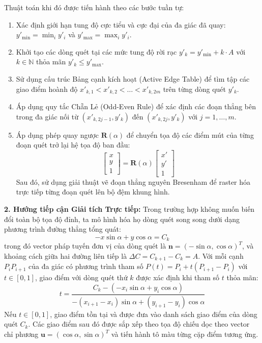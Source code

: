 Thuật toán khi đó được tiến hành theo các bước tuần tự:
\begin{enumerate}[label=\alph*)]
    \item Xác định giới hạn tung độ cực tiểu và cực đại của đa giác đã quay: $y'_{\min} = \min_{i} y'_i$ và $y'_{\max} = \max_{i} y'_i$.
    \item Khởi tạo các dòng quét tại các mức tung độ rời rạc $y'_k = y'_{\min} + k \cdot A$ với $k \in \mathbb{N}$ thỏa mãn $y'_k \le y'_{\max}$.
    \item Sử dụng cấu trúc Bảng cạnh kích hoạt (Active Edge Table) để tìm tập các giao điểm hoành độ $x'_{k, 1} < x'_{k, 2} < \dots < x'_{k, 2m}$ trên từng dòng quét $y'_k$.
    \item Áp dụng quy tắc Chẵn Lẻ (Odd-Even Rule) để xác định các đoạn thẳng bên trong đa giác nối từ $(x'_{k, 2j-1}, y'_k)$ đến $(x'_{k, 2j}, y'_k)$ với $j = 1, \dots, m$.
    \item Áp dụng phép quay ngược $\mathbf{R}(\alpha)$ để chuyển tọa độ các điểm mút của từng đoạn quét trở lại hệ tọa độ ban đầu:
    \begin{equation}
    \begin{bmatrix} x \\ y \\ 1 \end{bmatrix} = \mathbf{R}(\alpha) \begin{bmatrix} x' \\ y' \\ 1 \end{bmatrix}
    \end{equation}
    Sau đó, sử dụng giải thuật vẽ đoạn thẳng nguyên Bresenham để raster hóa trực tiếp từng đoạn quét lên bộ đệm khung hình.
\end{enumerate}

\textbf{2. Hướng tiếp cận Giải tích Trực tiếp:}
Trong trường hợp không muốn biến đổi toàn bộ tọa độ đỉnh, ta mô hình hóa họ dòng quét song song dưới dạng phương trình đường thẳng tổng quát:
\begin{equation}
\label{eq:scanline_family_implicit}
-x \sin\alpha + y \cos\alpha = C_k
\end{equation}
trong đó vector pháp tuyến đơn vị của dòng quét là $\mathbf{n} = (-\sin\alpha, \cos\alpha)^T$, và khoảng cách giữa hai đường liên tiếp là $\Delta C = C_{k+1} - C_k = A$. Với mỗi cạnh $P_i P_{i+1}$ của đa giác có phương trình tham số $P(t) = P_i + t(P_{i+1} - P_i)$ với $t \in [0, 1]$, giao điểm với dòng quét thứ $k$ được xác định khi tham số $t$ thỏa mãn:
\begin{equation}
t = \frac{C_k - (-x_i \sin\alpha + y_i \cos\alpha)}{-(x_{i+1} - x_i) \sin\alpha + (y_{i+1} - y_i) \cos\alpha}
\end{equation}
Nếu $t \in [0, 1]$, giao điểm tồn tại và được đưa vào danh sách giao điểm của dòng quét $C_k$. Các giao điểm sau đó được sắp xếp theo tọa độ chiếu dọc theo vector chỉ phương $\mathbf{u} = (\cos\alpha, \sin\alpha)^T$ và tiến hành tô màu từng cặp điểm tương ứng.

